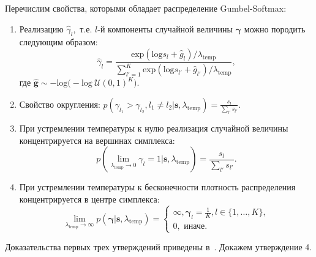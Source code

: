 Перечислим свойства, которыми обладает распределение Gumbel-Softmax:
\begin{enumerate}
\item Реализацию $\hat{\gamma}_l,$ т.е. $l$-й компоненты случайной величины $\boldsymbol{\gamma}$  можно породить следующим образом:
\[
    \hat{\gamma}_l = \frac{\text{exp}(\text{log}s_l+\hat{g}_l)/\lambda_{\text{temp}}}{\sum_{l'=1}^{K}\text{exp}(\text{log}s_{l'}+\hat{g}_{l'})/\lambda_{\text{temp}}},
\]
где $\hat{\mathbf{g}} \sim -\text{log}\bigl(-\text{log}~\mathcal{U}(0,1)^K\bigr).$ 

\item Свойство округления: $p(\gamma_{l_1} > \gamma_{l_2}, l_1\neq l_2|\mathbf{s}, {\lambda}_\text{temp}) = \frac{s_l}{\sum_{l'}s_{l'}}.$

\item При устремлении температуры к нулю реализация случайной величины концентрируется на вершинах симплекса:
\[
    p(\lim_{\lambda_{\text{temp}} \to 0}  \gamma_{l} = 1|\mathbf{s}, {\lambda}_\text{temp})  = \frac{s_l}{\sum_{l'}s_{l'}}.
\]


\item При устремлении температуры к бесконечности плотность распределения концентрируется в центре симплекса:
\begin{equation}
\label{eq:theorem_gs}
    \lim_{\lambda_{\text{temp}} \to \infty}  p(\boldsymbol{\gamma}|\mathbf{s}, {\lambda}_\text{temp}) = 
    \begin{cases}
    \infty, \boldsymbol{\gamma}_l = \frac{1}{K}, l \in \{1,\dots,K\},\\
    0, \text{ иначе.}
    \end{cases}
\end{equation}
\end{enumerate}

Доказательства первых трех утверждений приведены в~\cite{gumbel}. Докажем утверждение 4.

